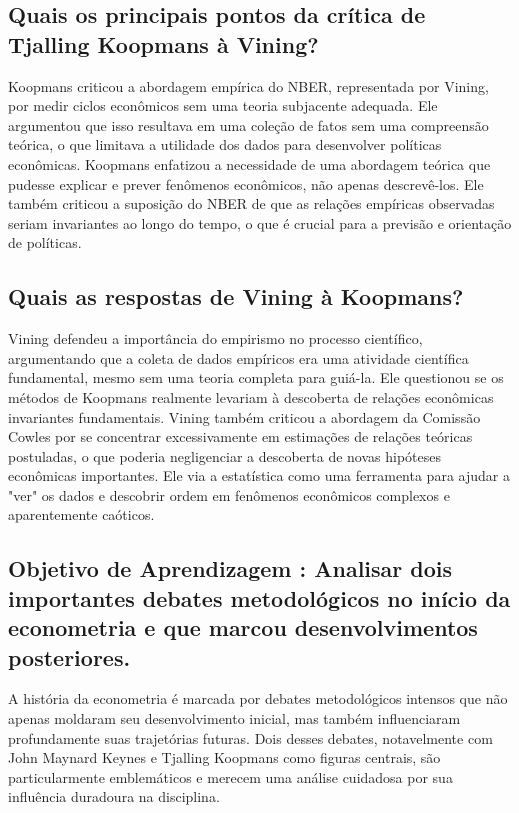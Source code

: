 \documentclass[a4paper,12pt]{article}[abntex2]
\begin{document}
\subsection{\textbf{Quais os principais pontos da crítica de Tjalling Koopmans à Vining?}}
Koopmans criticou a abordagem empírica do NBER, representada por Vining, por medir ciclos econômicos sem uma teoria subjacente adequada. Ele argumentou que isso resultava em uma coleção de fatos sem uma compreensão teórica, o que limitava a utilidade dos dados para desenvolver políticas econômicas. Koopmans enfatizou a necessidade de uma abordagem teórica que pudesse explicar e prever fenômenos econômicos, não apenas descrevê-los. Ele também criticou a suposição do NBER de que as relações empíricas observadas seriam invariantes ao longo do tempo, o que é crucial para a previsão e orientação de políticas.

\subsection{\textbf{Quais as respostas de Vining à Koopmans?}}
Vining defendeu a importância do empirismo no processo científico, argumentando que a coleta de dados empíricos era uma atividade científica fundamental, mesmo sem uma teoria completa para guiá-la. Ele questionou se os métodos de Koopmans realmente levariam à descoberta de relações econômicas invariantes fundamentais. Vining também criticou a abordagem da Comissão Cowles por se concentrar excessivamente em estimações de relações teóricas postuladas, o que poderia negligenciar a descoberta de novas hipóteses econômicas importantes. Ele via a estatística como uma ferramenta para ajudar a "ver" os dados e descobrir ordem em fenômenos econômicos complexos e aparentemente caóticos.

\subsection{\textbf{Objetivo de Aprendizagem : Analisar dois importantes debates metodológicos no início da econometria e que marcou desenvolvimentos posteriores. }}
A história da econometria é marcada por debates metodológicos intensos que não apenas moldaram seu desenvolvimento inicial, mas também influenciaram profundamente suas trajetórias futuras. Dois desses debates, notavelmente com John Maynard Keynes e Tjalling Koopmans como figuras centrais, são particularmente emblemáticos e merecem uma análise cuidadosa por sua influência duradoura na disciplina.
\end{document}
